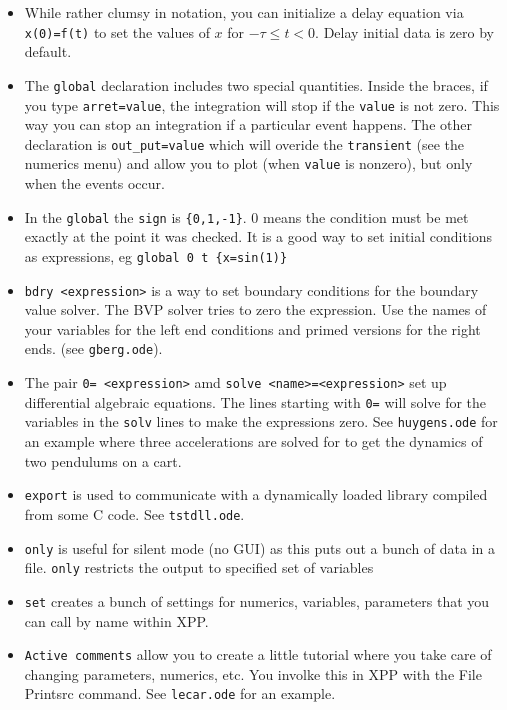 \begin{itemize}
\item While rather clumsy in notation, you can initialize a delay equation via {\tt x(0)=f(t)} to set the values of $x$ for $-\tau\le t<0.$ Delay initial data is zero by default.  
\item The {\tt global} declaration includes two special quantities. Inside the braces, if you type {\tt arret=value}, the integration will stop if the {\tt value} is not zero. This way you can stop an integration if a particular event happens. The other declaration is {\tt out\_put=value} which will overide the {\tt transient} (see the numerics menu)  and allow you to plot (when {\tt value} is nonzero), but only when the events occur.  
\item In the {\tt global} the {\tt sign} is {\tt \{0,1,-1\}}. 0 means the condition must be met exactly at the point it was checked. It is a good way to set initial conditions as expressions, eg {\tt global 0 t \{x=sin(1)\} }
\item {\tt bdry <expression>} is a way to set boundary conditions for the boundary value solver. The BVP solver tries to zero the expression. Use the names of your variables for the left end conditions and primed versions for the right ends. (see {\tt gberg.ode}). 
\item The pair {\tt 0= <expression>} amd {\tt solve <name>=<expression>} set up differential algebraic equations. The lines starting with {\tt 0=} will solve for the variables in the {\tt solv} lines to make the expressions zero. See {\tt huygens.ode} for an example where three accelerations are solved for to get the dynamics of two pendulums on a cart.
\item {\tt export} is used to communicate with a dynamically loaded library compiled from some C code.  See {\tt tstdll.ode}.
\item {\tt only} is useful for silent mode (no GUI) as this puts out a bunch of data in a file. {\tt only} restricts the output to specified set of variables
\item {\tt set} creates a bunch of settings for numerics, variables, parameters that you can call by name within XPP.
\item {\tt Active comments} allow you to create a little tutorial where you take care of changing parameters, numerics, etc. You involke this in XPP with the File Printsrc command. See {\tt lecar.ode} for an example.


\end{itemize}
